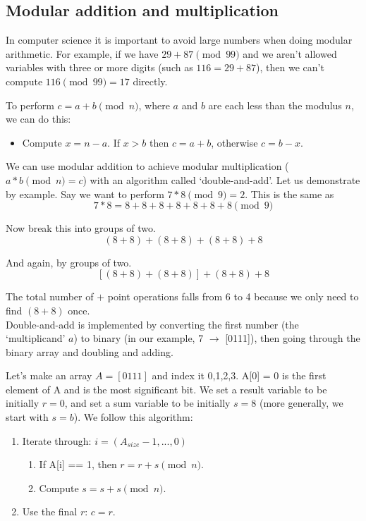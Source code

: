 \subsection{Modular addition and multiplication}
\label{subsec:modular-addition-multiplication}

In computer science it is important to avoid large numbers when doing modular arithmetic. For example, if we have $29+87 \pmod{99}$ and we aren't allowed variables with three or more digits (such as $116 = 29+87$), then we can't compute $116 \pmod{99} = 17$ directly.

To perform $c = a+b \pmod n$, where $a$ and $b$ are each less than the modulus $n$, we can do this:
\begin{itemize}
	\item Compute $x = n-a$. If $x > b$ then $c = a+b$, otherwise $c = b - x$.
\end{itemize}

We can use modular addition to achieve modular multiplication ($a*b \pmod n = c$) with an algorithm called `double-and-add'. Let us demonstrate by example. Say we want to perform $7*8 \pmod 9 = 2$. This is the same as 
\[7*8 = 8+8+8+8+8+8+8 \pmod 9\]

Now break this into groups of two. 
\[(8+8) + (8+8) + (8+8) + 8\]

And again, by groups of two.
\[[(8+8) + (8+8)] + (8+8) + 8\]

The total number of $+$ point operations falls from 6 to 4 because we only need to find $(8+8)$ once.\\

Double-and-add is implemented by converting the first number (the `multiplicand' $a$) to binary (in our example, 7 $\rightarrow$ [0111]), then going through the binary array and doubling and adding. 

Let's make an array $A = [0111]$ and index it 0,1,2,3. A[0] = 0 is the first element of A and is the most significant bit. We set a result variable to be initially $r = 0$, and set a sum variable to be initially $s = 8$ (more generally, we start with $s = b$). We follow this algorithm:

\begin{enumerate}
	\item Iterate through: $i = (A_{size} - 1,...,0)$
	\begin{enumerate}
		\item If A[i] == 1, then $r = r + s \pmod n$.
		\item Compute $s = s + s \pmod n$.
	\end{enumerate}
	\item Use the final $r$: $c = r$.
\end{enumerate}


